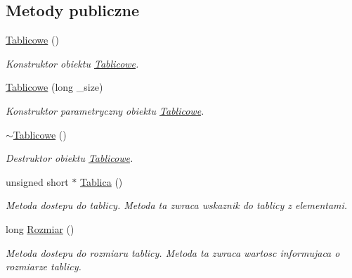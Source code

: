 \subsection*{Metody publiczne}
\begin{DoxyCompactItemize}
\item 
\hyperlink{class_tablicowe_a4d196c9114db4b6b61cef50fd698d69f}{Tablicowe} ()
\begin{DoxyCompactList}\small\item\em Konstruktor obiektu \hyperlink{class_tablicowe}{Tablicowe}. \end{DoxyCompactList}\item 
\hyperlink{class_tablicowe_a902e880a45d8aa4a56ffd2c532fac089}{Tablicowe} (long \-\_\-size)
\begin{DoxyCompactList}\small\item\em Konstruktor parametryczny obiektu \hyperlink{class_tablicowe}{Tablicowe}. \end{DoxyCompactList}\item 
\hyperlink{class_tablicowe_a94d02a8e05704c517f13e719b48438c9}{$\sim$\-Tablicowe} ()
\begin{DoxyCompactList}\small\item\em Destruktor obiektu \hyperlink{class_tablicowe}{Tablicowe}. \end{DoxyCompactList}\item 
unsigned short $\ast$ \hyperlink{class_tablicowe_a9bd02a6e8e5bfa71dd6c013b01c5804d}{Tablica} ()
\begin{DoxyCompactList}\small\item\em Metoda dostepu do tablicy. Metoda ta zwraca wskaznik do tablicy z elementami. \end{DoxyCompactList}\item 
long \hyperlink{class_tablicowe_ad14403696dc11666296722331dd075b4}{Rozmiar} ()
\begin{DoxyCompactList}\small\item\em Metoda dostepu do rozmiaru tablicy. Metoda ta zwraca wartosc informujaca o rozmiarze tablicy. \end{DoxyCompactList}\end{DoxyCompactItemize}

